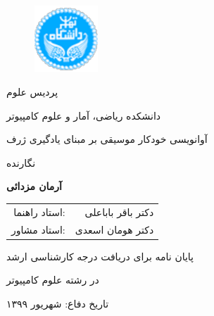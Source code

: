 \begin{figure}
    \centering
    \includegraphics[height=2.5cm]{./statics/UT-Logo.pdf}
\end{figure}

\begin{center}
    پردیس علوم

    دانشکده ریاضی، آمار و علوم کامپیوتر
\end{center}

\vspace{1cm}

\begin{center}
    \huge{آوانویسی خودکار موسیقی بر مبنای یادگیری ژرف}
\end{center}

\vspace{1cm}

\begin{center}
    نگارنده
\end{center}
\begin{center}
    \textbf{آرمان مزدائی}
\end{center}

\begin{center}
    \begin{tabular}{rr}
        استاد راهنما:& دکتر باقر باباعلی
        \\
        استاد مشاور:& دکتر هومان اسعدی
    \end{tabular}
\end{center}

\vspace{3cm}
\begin{center}
    پایان نامه برای دریافت درجه کارشناسی ارشد

    در رشته علوم کامپیوتر
\end{center}

\begin{center}
تاریخ دفاع: شهریور ۱۳۹۹
\end{center}

\pagestyle{empty}
\pagenumbering{}